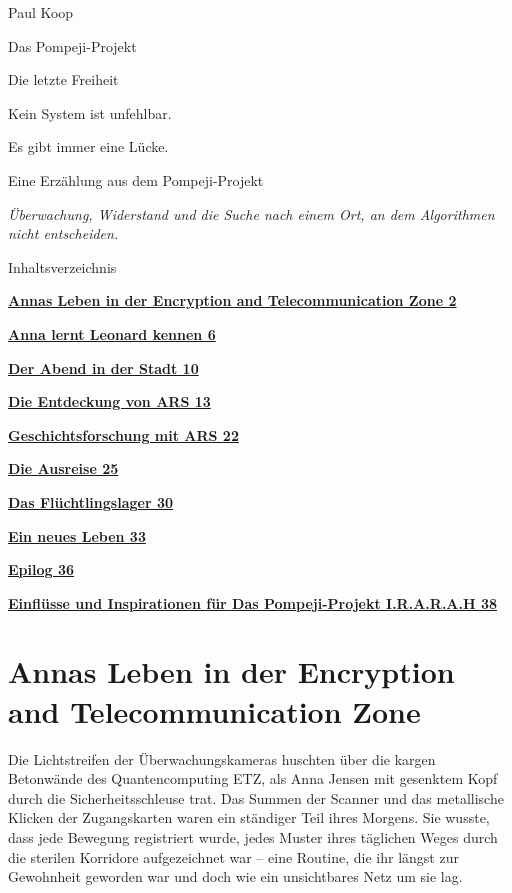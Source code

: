 \documentclass[
]{article}
\author{}
\date{}
\begin{document}
{
\setcounter{tocdepth}{3}
\tableofcontents
}
Paul Koop

Das Pompeji-Projekt

Die letzte Freiheit

Kein System ist unfehlbar.

Es gibt immer eine Lücke.

Eine Erzählung aus dem Pompeji-Projekt

\emph{Überwachung, Widerstand und die Suche nach einem Ort, an dem Algorithmen nicht entscheiden.}

Inhaltsverzeichnis

\hyperref[annas-leben-in-der-encryption-and-telecommunication-zone]{\textbf{Annas Leben in der Encryption and Telecommunication Zone 2}}

\hyperref[anna-lernt-leonard-kennen]{\textbf{Anna lernt Leonard kennen 6}}

\hyperref[der-abend-in-der-stadt]{\textbf{Der Abend in der Stadt 10}}

\hyperref[die-entdeckung-von-ars]{\textbf{Die Entdeckung von ARS 13}}

\hyperref[geschichtsforschung-mit-ars]{\textbf{Geschichtsforschung mit ARS 22}}

\hyperref[die-ausreise]{\textbf{Die Ausreise 25}}

\hyperref[das-fluxfcchtlingslager]{\textbf{Das Flüchtlingslager 30}}

\hyperref[ein-neues-leben]{\textbf{Ein neues Leben 33}}

\hyperref[epilog]{\textbf{Epilog 36}}

\hyperref[einfluxfcsse-und-inspirationen-fuxfcr-das-pompeji-projekt-i.r.a.r.a.h]{\textbf{Einflüsse und Inspirationen für Das Pompeji-Projekt I.R.A.R.A.H 38}}

\section{Annas Leben in der Encryption and Telecommunication Zone}\label{annas-leben-in-der-encryption-and-telecommunication-zone}

Die Lichtstreifen der Überwachungskameras huschten über die kargen Betonwände des Quantencomputing ETZ, als Anna Jensen mit gesenktem Kopf durch die Sicherheitsschleuse trat. Das Summen der Scanner und das metallische Klicken der Zugangskarten waren ein ständiger Teil ihres Morgens. Sie wusste, dass jede Bewegung registriert wurde, jedes Muster ihres täglichen Weges durch die sterilen Korridore aufgezeichnet war -- eine Routine, die ihr längst zur Gewohnheit geworden war und doch wie ein unsichtbares Netz um sie lag.
\end{document}
